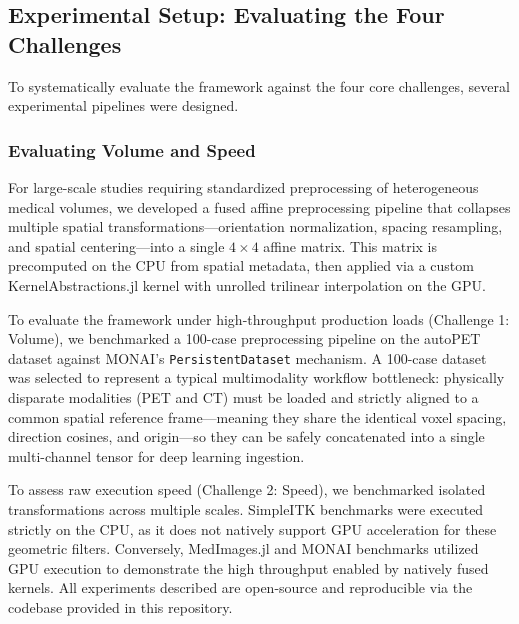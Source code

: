 \documentclass[10pt,letterpaper]{article}
\begin{document}
\subsection{Experimental Setup: Evaluating the Four Challenges}
To systematically evaluate the framework against the four core challenges, several experimental pipelines were designed.

\subsubsection{Evaluating Volume and Speed}
For large-scale studies requiring standardized preprocessing of heterogeneous medical volumes, we developed a fused affine preprocessing pipeline that collapses multiple spatial transformations---orientation normalization, spacing resampling, and spatial centering---into a single $4 \times 4$ affine matrix. This matrix is precomputed on the CPU from spatial metadata, then applied via a custom KernelAbstractions.jl kernel with unrolled trilinear interpolation on the GPU.

To evaluate the framework under high-throughput production loads (Challenge 1: Volume), we benchmarked a 100-case preprocessing pipeline on the autoPET dataset \cite{Dexl_2025} against MONAI's \texttt{PersistentDataset} mechanism. A 100-case dataset was selected to represent a typical multimodality workflow bottleneck: physically disparate modalities (PET and CT) must be loaded and strictly aligned to a common spatial reference frame---meaning they share the identical voxel spacing, direction cosines, and origin---so they can be safely concatenated into a single multi-channel tensor for deep learning ingestion.

To assess raw execution speed (Challenge 2: Speed), we benchmarked isolated transformations across multiple scales. SimpleITK benchmarks were executed strictly on the CPU, as it does not natively support GPU acceleration for these geometric filters. Conversely, MedImages.jl and MONAI benchmarks utilized GPU execution to demonstrate the high throughput enabled by natively fused kernels. All experiments described are open-source and reproducible via the codebase provided in this repository.
\end{document}
